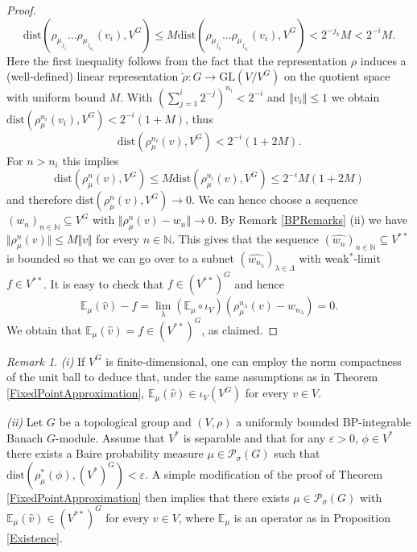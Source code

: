 \documentclass[a4paper,11pt,reqno]{amsart}
\numberwithin{equation}{section}
\theoremstyle{definition}
\theoremstyle{remark}
\theoremstyle{remark}
\newtheorem{remark}[theorem]{Remark}
\begin{document}
\begin{proof}
\[
\text{dist}\left(\rho_{\mu_{j_{1}}}...\rho_{\mu_{j_{n_{i}}}}(v_{i}),V^{G}\right)\leq M\text{dist}\left(\rho_{\mu_{j_{k}}}...\rho_{\mu_{j_{n_{i}}}}(v_{i}),V^{G}\right)<2^{-j_{k}}M<2^{-i}M.
\]
Here the first inequality follows from the fact that the representation $\rho$ induces a (well-defined) linear representation $\widetilde{\rho}:G\rightarrow\text{GL}(V/V^{G})$ on the quotient space with uniform bound $M$. With $(\sum_{j=1}^{i}2^{-j})^{n_{i}}<2^{-i}$ and $\Vert v_{i}\Vert\leq1$ we obtain $\text{dist}\left(\rho_{\mu}^{n_{i}}(v_{i}),V^{G}\right)<2^{-i}(1+M)$, thus 
\[
\text{dist}\left(\rho_{\mu}^{n_{i}}(v),V^{G}\right)<2^{-i}(1+2M).
\]
For $n>n_{i}$ this implies 
\[
\text{dist}\left(\rho_{\mu}^{n}(v),V^{G}\right)\leq M\text{dist}\left(\rho_{\mu}^{n_{i}}(v),V^{G}\right)\leq2^{-i}M(1+2M)
\]
and therefore $\text{dist}\left(\rho_{\mu}^{n}(v),V^{G}\right)\rightarrow0$. We can hence choose a sequence $(w_{n})_{n\in\mathbb{N}}\subseteq V^{G}$ with $\Vert\rho_{\mu}^{n}(v)-w_{n}\Vert\rightarrow0$. By Remark \ref{BPRemarks} (ii) we have $\Vert\rho_{\mu}^{n}(v)\Vert\leq M\Vert v\Vert$ for every $n\in\mathbb{N}$. This gives that the sequence $(\widehat{w_{n}})_{n\in\mathbb{N}}\subseteq V^{\ast\ast}$ is bounded so that we can go over to a subnet $(\widehat{w_{n_{\lambda}}})_{\lambda\in\Lambda}$ with weak$^{\ast}$-limit $f\in V^{\ast\ast}$. It is easy to check that $f\in(V^{\ast\ast})^{G}$ and hence 
\[
\mathbb{E}_{\mu}(\widehat{v})-f=\lim_{\lambda}(\mathbb{E}_{\mu}\circ\iota_{V})\left(\rho_{\mu}^{n_{\lambda}}(v)-w_{n_{\lambda}}\right)=0.
\]
We obtain that $\mathbb{E}_{\mu}(\widehat{v})=f\in(V^{\ast\ast})^{G}$, as claimed. \end{proof}

\begin{remark} \emph{(i)} If $V^{G}$ is finite-dimensional, one can employ the norm compactness of the unit ball to deduce that, under the same assumptions as in Theorem \ref{FixedPointApproximation}, $\mathbb{E}_{\mu}(\widehat{v})\in\iota_{V}(V^{G})$ for every $v\in V$.

\emph{(ii)} Let $G$ be a topological group and $(V,\rho)$ a uniformly bounded BP-integrable Banach $G$-module. Assume that $V^{\ast}$ is separable and that for any $\varepsilon>0$, $\phi\in V^{\ast}$ there exists a Baire probability measure $\mu\in\mathcal{P}_{\sigma}(G)$ such that $\text{dist}\left(\rho_{\mu}^{\ast}(\phi),(V^{\ast})^{G}\right)<\varepsilon$. A simple modification of the proof of Theorem \ref{FixedPointApproximation} then implies that there exists $\mu\in\mathcal{P}_{\sigma}(G)$ with $\mathbb{E}_{\mu}(\widehat{v})\in(V^{\ast\ast})^{G}$ for every $v\in V$, where $\mathbb{E}_{\mu}$ is an operator as in Proposition \ref{Existence}. \end{remark}
\end{document}
